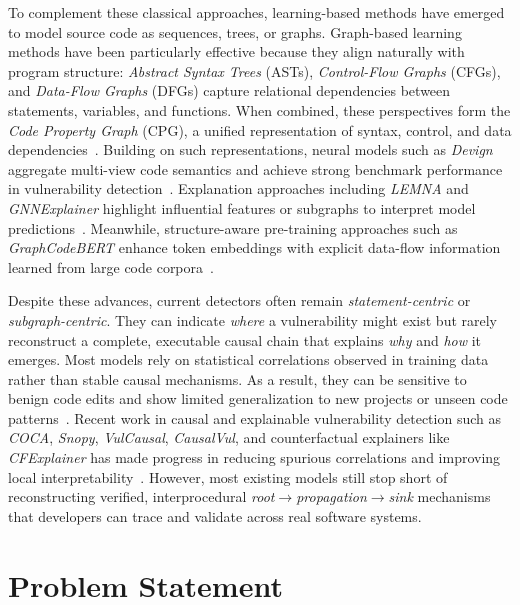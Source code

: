 \documentclass{buthesis}
\begin{document}
To complement these classical approaches, learning-based methods have emerged to model source code as sequences, trees, or graphs. 
Graph-based learning methods have been particularly effective because they align naturally with program structure: 
\emph{Abstract Syntax Trees} (ASTs), \emph{Control-Flow Graphs} (CFGs), and \emph{Data-Flow Graphs} (DFGs) capture relational dependencies between statements, variables, and functions. 
When combined, these perspectives form the \emph{Code Property Graph} (CPG), a unified representation of syntax, control, and data dependencies~\cite{yamaguchi2014cpg}. 
Building on such representations, neural models such as \emph{Devign} aggregate multi-view code semantics and achieve strong benchmark performance in vulnerability detection~\cite{Zhou2019}. 
Explanation approaches including \emph{LEMNA} and \emph{GNNExplainer} highlight influential features or subgraphs to interpret model predictions~\cite{guo2018lemna,ying2019gnnexplainer}. 
Meanwhile, structure-aware pre-training approaches such as \emph{GraphCodeBERT} enhance token embeddings with explicit data-flow information learned from large code corpora~\cite{guo2021graphcodebert}. 

Despite these advances, current detectors often remain \emph{statement-centric} or \emph{subgraph-centric}. 
They can indicate \emph{where} a vulnerability might exist but rarely reconstruct a complete, executable causal chain that explains \emph{why} and \emph{how} it emerges. 
Most models rely on statistical correlations observed in training data rather than stable causal mechanisms. 
As a result, they can be sensitive to benign code edits and show limited generalization to new projects or unseen code patterns~\cite{Li2022Empirical,yang2022natural}. 
Recent work in causal and explainable vulnerability detection such as \emph{COCA}, \emph{Snopy}, \emph{VulCausal}, \emph{CausalVul}, and counterfactual explainers like \emph{CFExplainer} has made progress in reducing spurious correlations and improving local interpretability~\cite{Cao2024ASE,Kuang2024KSEM,Rahman2024ICSE,Chu2024ISSTA}. 
However, most existing models still stop short of reconstructing verified, interprocedural \emph{root$\rightarrow$propagation$\rightarrow$sink} mechanisms that developers can trace and validate across real software systems.





\section{Problem Statement}
\label{sec:intro-problem}
\end{document}
